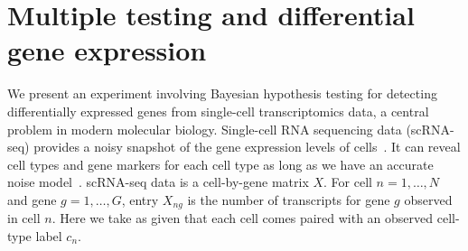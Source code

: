 \section{Multiple testing and differential gene expression}
\label{FDR}

We present an experiment involving Bayesian hypothesis testing for detecting differentially expressed genes from single-cell transcriptomics data, a central problem in modern molecular biology. Single-cell RNA sequencing data (scRNA-seq) provides a noisy snapshot of the gene expression levels of cells~\cite{Wagner2016, Tanay2017}. It can reveal cell types and gene markers for each cell type as long as we have an accurate noise model~\cite{Grun2014}. scRNA-seq data is a cell-by-gene matrix $X$.
For cell $n=1,\ldots,N$ and gene $g=1,\ldots,G$,
entry $X_{ng}$ is the number of transcripts for gene $g$ observed in cell $n$.
Here we take as given that each cell comes paired with an observed cell-type label $c_n$. 

